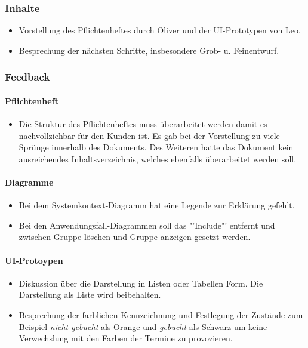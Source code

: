 \subsubsection{Inhalte}
\begin{itemize}
\item Vorstellung des Pflichtenheftes durch Oliver und der UI-Prototypen von Leo.
\item Besprechung der nächsten Schritte, insbesondere Grob- u. Feinentwurf.
\end{itemize}

\subsubsection{Feedback}

\paragraph{Pflichtenheft}
\begin{itemize}
\item Die Struktur des Pflichtenheftes muss überarbeitet werden damit es nachvollziehbar für den Kunden ist. Es gab bei der Vorstellung zu viele Sprünge innerhalb des Dokuments. Des Weiteren hatte das Dokument kein ausreichendes Inhaltsverzeichnis, welches ebenfalls überarbeitet werden soll.
\end{itemize}

\paragraph{Diagramme}
\begin{itemize}
\item Bei dem Systemkontext-Diagramm hat eine Legende zur Erklärung gefehlt.
\item Bei den Anwendungsfall-Diagrammen soll das "'Include"' entfernt und zwischen Gruppe löschen und Gruppe anzeigen gesetzt werden.
\end{itemize}

\paragraph{UI-Protoypen}
\begin{itemize}
\item Diskussion über die Darstellung in Listen oder Tabellen Form. Die Darstellung als Liste wird beibehalten.
\item Besprechung der farblichen Kennzeichnung und Festlegung der Zustände zum Beispiel \textit{nicht gebucht} als Orange und \textit{gebucht} als Schwarz um keine Verwechslung mit den Farben der Termine zu provozieren.
\end{itemize}

